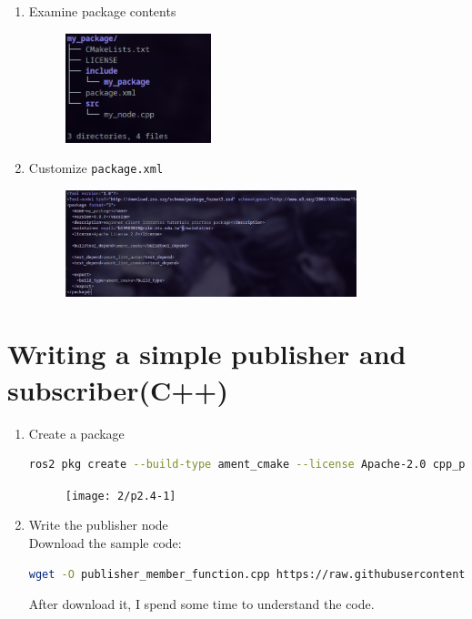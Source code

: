 \documentclass[12pt, a4paper]{article}
\begin{document}
\begin{enumerate}
\newpage
\item Examine package contents
	\begin{figure}[h]
		\centering
		\includegraphics[width=0.4\textwidth]{2/p2.3-4}
	\end{figure}
\item Customize \texttt{package.xml}
	\begin{figure}[h]
		\centering
		\includegraphics[width=0.8\textwidth]{2/p2.3-5}
	\end{figure}
\end{enumerate}

\newpage
\section{Writing a simple publisher and subscriber(C++)}
\begin{enumerate}
	\item Create a package
\begin{lstlisting}[language=bash]
ros2 pkg create --build-type ament_cmake --license Apache-2.0 cpp_pubsub
\end{lstlisting}
\begin{figure}[h]
	\centering
	\texttt{[image: 2/p2.4-1]}
\end{figure}

\item Write the publisher node\\
Download the sample code:
\begin{lstlisting}[language=bash]
wget -O publisher_member_function.cpp https://raw.githubusercontent.com/ros2/examples/iron/rclcpp/topics/minimal_publisher/member_function.cpp
\end{lstlisting}
After download it, I spend some time to understand the code.
\end{enumerate}
\end{document}
